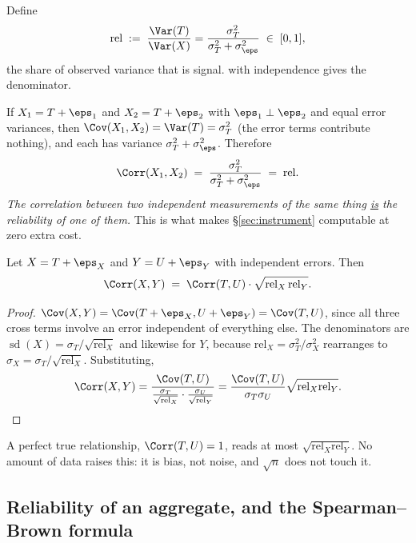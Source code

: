  Define
\[
\mathrm{rel} \;:=\; \frac{\Var(T)}{\Var(X)} = \frac{\sigma_T^2}{\sigma_T^2+\sigma_\eps^2}
\;\in\;[0,1],
\]
the share of observed variance that is signal.  with
independence gives the denominator.

 If $X_1 = T+\eps_1$ and
$X_2 = T+\eps_2$ with $\eps_1 \perp \eps_2$ and equal error variances, then
$\Cov(X_1,X_2) = \Var(T) = \sigma_T^2$ (the error terms contribute nothing), and
each has variance $\sigma_T^2+\sigma_\eps^2$. Therefore
\begin{equation}
\Corr(X_1,X_2) \;=\; \frac{\sigma_T^2}{\sigma_T^2+\sigma_\eps^2} \;=\; \mathrm{rel}.
\label{eq:relcorr}
\end{equation}
\emph{The correlation between two independent measurements of the same thing
\underline{is} the reliability of one of them.} This is what makes
§\ref{sec:instrument} computable at zero extra cost.

\begin{theorem}[Attenuation]
\label{thm:atten}
Let $X = T+\eps_X$ and $Y = U+\eps_Y$ with independent errors. Then
\[
\Corr(X,Y) \;=\; \Corr(T,U)\cdot\sqrt{\mathrm{rel}_X\,\mathrm{rel}_Y}.
\]
\end{theorem}
\begin{proof}
$\Cov(X,Y) = \Cov(T+\eps_X, U+\eps_Y) = \Cov(T,U)$, since all three cross terms
involve an error independent of everything else. The denominators are
$\operatorname{sd}(X) = \sigma_T/\sqrt{\mathrm{rel}_X}$ and likewise for $Y$,
because $\mathrm{rel}_X = \sigma_T^2/\sigma_X^2$ rearranges to
$\sigma_X = \sigma_T/\sqrt{\mathrm{rel}_X}$. Substituting,
\[
\Corr(X,Y) = \frac{\Cov(T,U)}{\frac{\sigma_T}{\sqrt{\mathrm{rel}_X}}\cdot\frac{\sigma_U}{\sqrt{\mathrm{rel}_Y}}}
= \frac{\Cov(T,U)}{\sigma_T\sigma_U}\sqrt{\mathrm{rel}_X\mathrm{rel}_Y}. \qedhere
\]
\end{proof}

\begin{corollary}
A perfect true relationship, $\Corr(T,U)=1$, reads at most
$\sqrt{\mathrm{rel}_X \mathrm{rel}_Y}$. No amount of data raises this: it is
bias, not noise, and $\sqrt{n}$ does not touch it.
\end{corollary}

\subsection{Reliability of an aggregate, and the Spearman--Brown formula}

